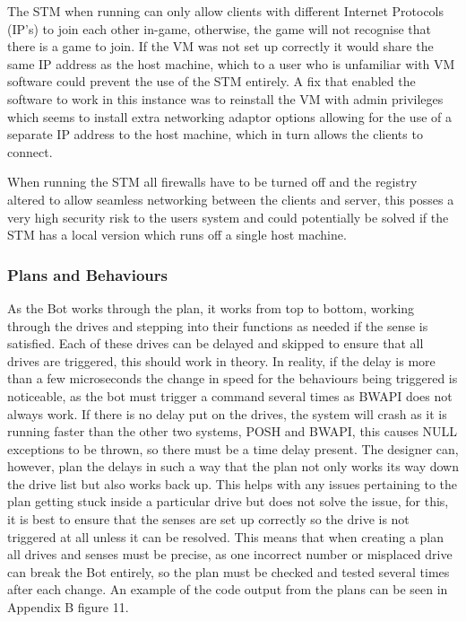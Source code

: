 \documentclass[journal]{IEEEtran}
\begin{document}
	The STM when running can only allow clients with different Internet Protocols (IP's) to join each other in-game, otherwise, the game will not recognise that there is a game to join. If the VM was not set up correctly it would share the same IP address as the host machine, which to a user who is unfamiliar with VM software could prevent the use of the STM entirely. A fix that enabled the software to work in this instance was to reinstall the VM with admin privileges which seems to install extra networking adaptor options allowing for the use of a separate IP address to the host machine, which in turn allows the clients to connect.
	
	When running the STM all firewalls have to be turned off and the registry altered to allow seamless networking between the clients and server, this posses a very high security risk to the users system and could potentially be solved if the STM has a local version which runs off a single host machine.
	\newline
	\subsubsection{Plans and Behaviours}
	As the Bot works through the plan, it works from top to bottom, working through the drives and stepping into their functions as needed if the sense is satisfied. Each of these drives can be delayed and skipped to ensure that all drives are triggered, this should work in theory. In reality, if the delay is more than a few microseconds the change in speed for the behaviours being triggered is noticeable, as the bot must trigger a command several times as BWAPI does not always work. If there is no delay put on the drives, the system will crash as it is running faster than the other two systems, POSH and BWAPI, this causes NULL exceptions to be thrown, so there must be a time delay present. The designer can, however, plan the delays in such a way that the plan not only works its way down the drive list but also works back up. This helps with any issues pertaining to the plan getting stuck inside a particular drive but does not solve the issue, for this, it is best to ensure that the senses are set up correctly so the drive is not triggered at all unless it can be resolved. This means that when creating a plan all drives and senses must be precise, as one incorrect number or misplaced drive can break the Bot entirely, so the plan must be checked and tested several times after each change. An example of the code output from the plans can be seen in Appendix B figure 11.
	
\end{document}
